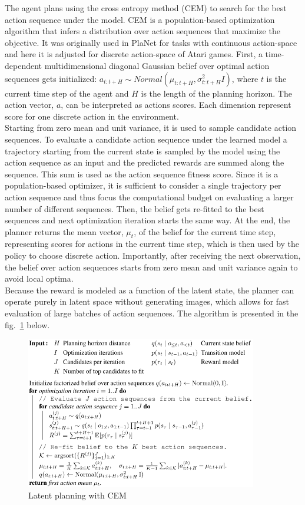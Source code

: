 The agent plans using the cross entropy method (CEM) \cite{Algo.CEM} to search for the best action sequence under the model. CEM is a population-based optimization algorithm that infers a distribution over action sequences that maximize the objective. It was originally used in PlaNet for tasks with continuous action-space and here it is adjusted for discrete action-space of Atari games. First, a time-dependent multidimensional diagonal Gaussian belief over optimal action sequences gets initialized: $a_{t:t+H} \sim Normal(\mu_{t:t+H}, \sigma^2_{t:t+H}I)$, where $t$ is the current time step of the agent and $H$ is the length of the planning horizon. The action vector, $a$, can be interpreted as actions scores. Each dimension represent score for one discrete action in the environment. \\
Starting from zero mean and unit variance, it is used to sample candidate action sequences. To evaluate a candidate action sequence under the learned model a trajectory starting from the current state is sampled by the model using the action sequence as an input and the predicted rewards are summed along the sequence. This sum is used as the action sequence fitness score. Since it is a population-based optimizer, it is sufficient to consider a single trajectory per action sequence and thus focus the computational budget on evaluating a larger number of different sequences. Then, the belief gets re-fitted to the best sequences and next optimization iteration starts the same way. At the end, the planner returns the mean vector, $\mu_t$, of the belief for the current time step, representing scores for actions in the current time step, which is then used by the policy to choose discrete action. Importantly, after receiving the next observation, the belief over action sequences starts from zero mean and unit variance again to avoid local optima. \\
Because the reward is modeled as a function of the latent state, the planner can operate purely in latent space without generating images, which allows for fast evaluation of large batches of action sequences. The algorithm is presented in the fig.~\ref{Fig.CEMinPlaNet} below.

\begin{figure}[H]
\includegraphics[width=0.9\textwidth,keepaspectratio]{figures/PlaNet/CEM.png}
\caption{Latent planning with CEM \cite{Algo.PlaNet}}
\label{Fig.CEMinPlaNet}
\end{figure}

